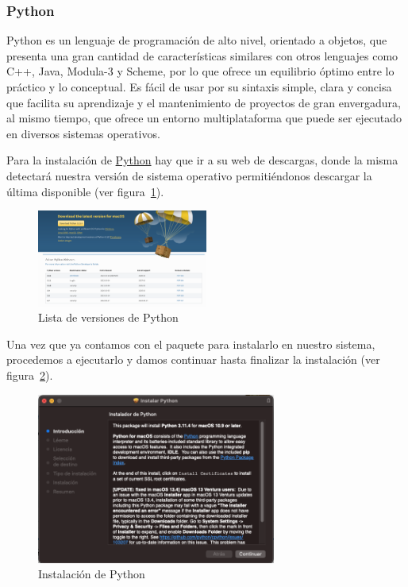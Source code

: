 \subsubsection{Python}\label{python}
Python es un lenguaje de programación de alto nivel, orientado a objetos, que presenta una gran cantidad de características similares con otros lenguajes como C++, Java, Modula-3 y Scheme, por lo que ofrece un equilibrio óptimo entre lo práctico y lo conceptual. Es fácil de usar por su sintaxis simple, clara y concisa que facilita su aprendizaje y el mantenimiento de proyectos de gran envergadura, al mismo tiempo, que ofrece un entorno multiplataforma que puede ser ejecutado en diversos sistemas operativos.

Para la instalación de \href{https://www.python.org/downloads/}{Python} hay que ir a su web de descargas, donde la misma detectará nuestra versión de sistema operativo permitiéndonos descargar la última disponible (ver figura~\ref{Img:Lista+de+versiones+de+Python}).

\begin{figure}[h]
    \centering
    \includegraphics[width=0.5\textwidth]{img/manual/lista-versiones-python.png}
    \caption{Lista de versiones de Python} \label{Img:Lista+de+versiones+de+Python}
\end{figure} 
Una vez que ya contamos con el paquete para instalarlo en nuestro sistema, procedemos a ejecutarlo y damos continuar hasta finalizar la instalación (ver figura~\ref{Img:Instalación+de+Python}).

\begin{figure}[h]
    \centering
    \includegraphics[width=0.7\textwidth]{img/manual/instalacion-python.png}
    \caption{Instalación de Python} \label{Img:Instalación+de+Python}
\end{figure} 

